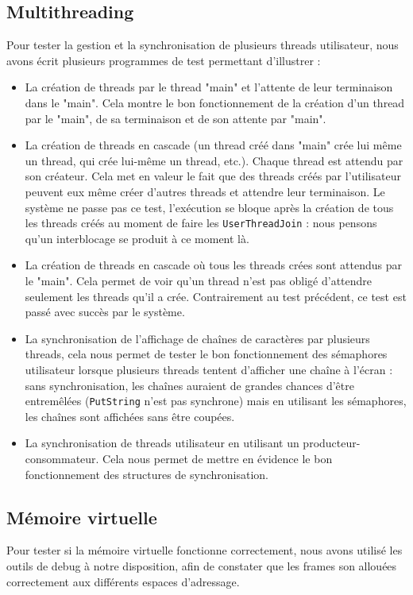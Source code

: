\documentclass{report}
\begin{document}
\subsection*{Multithreading}
\noindent
Pour tester la gestion et la synchronisation de plusieurs threads utilisateur, nous avons écrit plusieurs programmes de test permettant d'illustrer : 
\begin{itemize}
 \item La création de threads par le thread "main" et l'attente de leur terminaison dans le "main". Cela montre le bon fonctionnement de la création d'un thread par le "main", de sa terminaison et de son attente par "main".
 \item  La création de threads en cascade (un thread créé dans "main" crée lui même un thread, qui crée lui-même un thread, etc.).  Chaque thread est attendu par son créateur. Cela met en valeur le fait que des threads créés par l'utilisateur peuvent eux même créer d'autres threads et attendre leur terminaison. Le système ne passe pas ce test, l’exécution se bloque après la création de tous les threads créés au moment de faire les \texttt{UserThreadJoin} : nous pensons qu'un interblocage se produit à ce moment là. 
 \item La création de threads en cascade où tous les threads crées sont attendus par le "main". Cela permet de voir qu'un thread n'est pas obligé d'attendre seulement les threads qu'il a crée. Contrairement au test précédent, ce test est passé avec succès par le système.

\item La synchronisation de l'affichage de chaînes de caractères par plusieurs threads, cela nous permet de tester le bon fonctionnement des sémaphores utilisateur lorsque plusieurs threads tentent d'afficher une chaîne à l'écran : sans synchronisation, les chaînes auraient de grandes chances d'être entremêlées (\texttt{PutString} n'est pas synchrone) mais en utilisant les sémaphores, les chaînes sont affichées sans être coupées.

\item La synchronisation de threads utilisateur en utilisant un producteur-consommateur. Cela nous permet de mettre en évidence le bon fonctionnement des structures de synchronisation.
\end{itemize}

\subsection*{Mémoire virtuelle}
Pour tester si la mémoire virtuelle fonctionne correctement, nous avons utilisé les outils de debug à notre disposition, afin de constater que les frames son allouées correctement aux différents espaces d'adressage.\\
\end{document}
